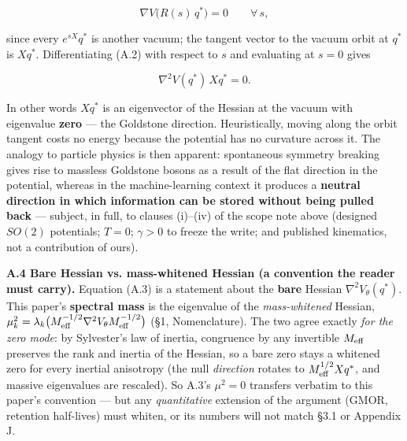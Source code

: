 \documentclass[10pt]{article}
\begin{document}
\begin{equation}
\nabla V\big(R(s)\,q^*\big)=0\qquad\forall\,s,
\end{equation}

since every $e^{sX}q^*$ is another vacuum; the tangent vector to the vacuum orbit at $q^*$ is $Xq^*$. Differentiating (A.2) with respect to $s$ and evaluating at $s=0$ gives

\begin{equation}
\nabla^2V(q^*)\,Xq^*=0.
\end{equation}

In other words $Xq^*$ is an eigenvector of the Hessian at the vacuum with eigenvalue \textbf{zero} --- the Goldstone direction. Heuristically, moving along the orbit tangent costs no energy because the potential has no curvature across it. The analogy to particle physics is then apparent: spontaneous symmetry breaking gives rise to massless Goldstone bosons as a result of the flat direction in the potential, whereas in the machine-learning context it produces a \textbf{neutral direction in which information can be stored without being pulled back} --- subject, in full, to clauses (i)--(iv) of the scope note above (designed $SO(2)$ potentials; $T=0$; $\gamma>0$ to freeze the write; and published kinematics, not a contribution of ours).

\textbf{A.4 Bare Hessian vs. mass-whitened Hessian (a convention the reader must carry).} Equation (A.3) is a statement about the \textbf{bare} Hessian $\nabla^2V_\theta(q^*)$. This paper's \textbf{spectral mass} is the eigenvalue of the \emph{mass-whitened} Hessian, $\mu_k^2=\lambda_k\big(M_{\rm eff}^{-1/2}\nabla^2V_\theta M_{\rm eff}^{-1/2}\big)$ (\S1, Nomenclature). The two agree exactly \emph{for the zero mode}: by Sylvester's law of inertia, congruence by any invertible $M_{\rm eff}$ preserves the rank and inertia of the Hessian, so a bare zero stays a whitened zero for every inertial anisotropy (the null \emph{direction} rotates to $M_{\rm eff}^{1/2}Xq^*$, and massive eigenvalues are rescaled). So A.3's $\mu^2=0$ transfers verbatim to this paper's convention --- but any \emph{quantitative} extension of the argument (GMOR, retention half-lives) must whiten, or its numbers will not match \S3.1 or Appendix J.
\end{document}
